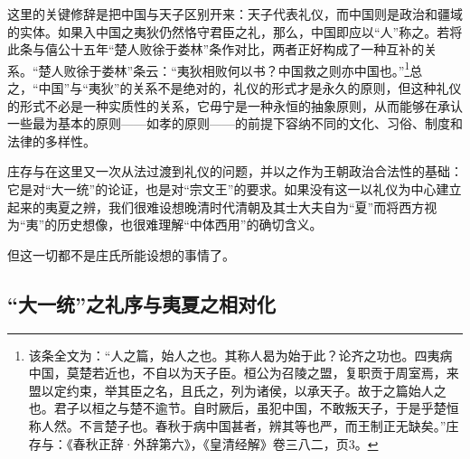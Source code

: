 \documentclass[a4paper, 12pt, openright]{ctexbook}
\begin{document}
这里的关键修辞是把中国与天子区别开来：天子代表礼仪，而中国则是政治和疆域的实体。如果入中国之夷狄仍然恪守君臣之礼，那么，中国即应以“人”称之。若将此条与僖公十五年“楚人败徐于娄林”条作对比，两者正好构成了一种互补的关系。“楚人败徐于娄林”条云：“夷狄相败何以书？中国救之则亦中国也。”\footnote{该条全文为：“人之篇，始人之也。其称人曷为始于此？论齐之功也。四夷病中国，莫楚若近也，不自以为天子臣。桓公为召陵之盟，复职贡于周室焉，来盟以定约束，举其臣之名，且氏之，列为诸侯，以承天子。故于之篇始人之也。君子以桓之与楚不逾节。自时厥后，虽犯中国，不敢叛天子，于是乎楚恒称人然。不言楚子也。春秋于病中国甚者，辨其等也严，而王制正无缺矣。”庄存与：《春秋正辞·外辞第六》，《皇清经解》卷三八二，页3。}总之，“中国”与“夷狄”的关系不是绝对的，礼仪的形式才是永久的原则，但这种礼仪的形式不必是一种实质性的关系，它毋宁是一种永恒的抽象原则，从而能够在承认一些最为基本的原则——如孝的原则——的前提下容纳不同的文化、习俗、制度和法律的多样性。

庄存与在这里又一次从法过渡到礼仪的问题，并以之作为王朝政治合法性的基础：它是对“大一统”的论证，也是对“宗文王”的要求。如果没有这一以礼仪为中心建立起来的夷夏之辨，我们很难设想晚清时代清朝及其士大夫自为“夏”而将西方视为“夷”的历史想像，也很难理解“中体西用”的确切含义。

但这一切都不是庄氏所能设想的事情了。

\subsection{“大一统”之礼序与夷夏之相对化}
\end{document}
